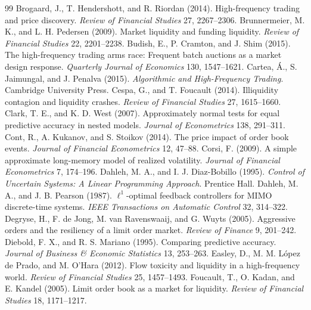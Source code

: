 \documentclass[12pt]{article}
\theoremstyle{definition}
\theoremstyle{remark}
\begin{document}
\begin{thebibliography}{99}
 Brogaard, J., T. Hendershott, and R. Riordan (2014). High-frequency trading and price discovery. \emph{Review of Financial Studies} 27, 2267--2306.
 Brunnermeier, M. K., and L. H. Pedersen (2009). Market liquidity and funding liquidity. \emph{Review of Financial Studies} 22, 2201--2238.
 Budish, E., P. Cramton, and J. Shim (2015). The high-frequency trading arms race: Frequent batch auctions as a market design response. \emph{Quarterly Journal of Economics} 130, 1547--1621.
 Cartea, \'A., S. Jaimungal, and J. Penalva (2015). \emph{Algorithmic and High-Frequency Trading}. Cambridge University Press.
 Cespa, G., and T. Foucault (2014). Illiquidity contagion and liquidity crashes. \emph{Review of Financial Studies} 27, 1615--1660.
 Clark, T. E., and K. D. West (2007). Approximately normal tests for equal predictive accuracy in nested models. \emph{Journal of Econometrics} 138, 291--311.
 Cont, R., A. Kukanov, and S. Stoikov (2014). The price impact of order book events. \emph{Journal of Financial Econometrics} 12, 47--88.
 Corsi, F. (2009). A simple approximate long-memory model of realized volatility. \emph{Journal of Financial Econometrics} 7, 174--196.
 Dahleh, M. A., and I. J. Diaz-Bobillo (1995). \emph{Control of Uncertain Systems: A Linear Programming Approach}. Prentice Hall.
 Dahleh, M. A., and J. B. Pearson (1987). $\ell^1$-optimal feedback controllers for MIMO discrete-time systems. \emph{IEEE Transactions on Automatic Control} 32, 314--322.
 Degryse, H., F. de Jong, M. van Ravenswaaij, and G. Wuyts (2005). Aggressive orders and the resiliency of a limit order market. \emph{Review of Finance} 9, 201--242.
 Diebold, F. X., and R. S. Mariano (1995). Comparing predictive accuracy. \emph{Journal of Business \& Economic Statistics} 13, 253--263.
 Easley, D., M. M. L\'opez de Prado, and M. O'Hara (2012). Flow toxicity and liquidity in a high-frequency world. \emph{Review of Financial Studies} 25, 1457--1493.
 Foucault, T., O. Kadan, and E. Kandel (2005). Limit order book as a market for liquidity. \emph{Review of Financial Studies} 18, 1171--1217.

\end{thebibliography}
\end{document}
